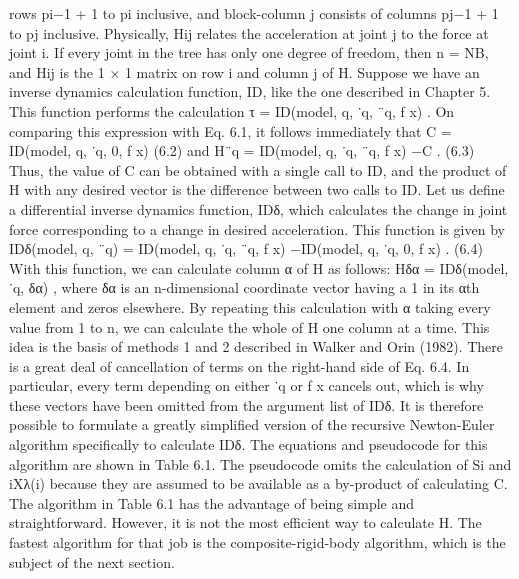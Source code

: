 rows pi−1 + 1 to pi inclusive, and block-column j consists of columns pj−1 + 1 to pj inclusive. Physically, Hij relates the acceleration at joint j to the force at joint i. If every joint in the tree has only one degree of freedom, then n = NB, and Hij is the 1 × 1 matrix on row i and column j of H. Suppose we have an inverse dynamics calculation function, ID, like the one described in Chapter 5. This function performs the calculation τ = ID(model, q, ˙q, ¨q, f x) . On comparing this expression with Eq. 6.1, it follows immediately that C = ID(model, q, ˙q, 0, f x) (6.2) and H¨q = ID(model, q, ˙q, ¨q, f x) −C . (6.3) Thus, the value of C can be obtained with a single call to ID, and the product of H with any desired vector is the difference between two calls to ID. Let us define a differential inverse dynamics function, IDδ, which calculates the change in joint force corresponding to a change in desired acceleration. This function is given by IDδ(model, q, ¨q) = ID(model, q, ˙q, ¨q, f x) −ID(model, q, ˙q, 0, f x) . (6.4) With this function, we can calculate column α of H as follows: Hδα = IDδ(model, ˙q, δα) , where δα is an n-dimensional coordinate vector having a 1 in its αth element and zeros elsewhere. By repeating this calculation with α taking every value from 1 to n, we can calculate the whole of H one column at a time. This idea is the basis of methods 1 and 2 described in Walker and Orin (1982). There is a great deal of cancellation of terms on the right-hand side of Eq. 6.4. In particular, every term depending on either ˙q or f x cancels out, which is why these vectors have been omitted from the argument list of IDδ. It is therefore possible to formulate a greatly simplified version of the recursive Newton-Euler algorithm specifically to calculate IDδ. The equations and pseudocode for this algorithm are shown in Table 6.1. The pseudocode omits the calculation of Si and iXλ(i) because they are assumed to be available as a by-product of calculating C. The algorithm in Table 6.1 has the advantage of being simple and straightforward. However, it is not the most efficient way to calculate H. The fastest algorithm for that job is the composite-rigid-body algorithm, which is the subject of the next section.

